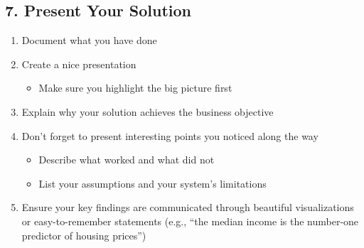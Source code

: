 \begin{slide}
  \section[-2]{7. Present Your Solution}

\begin{PauseHighLight}\squeeze
  \begin{enumerate}
  \item Document what you have done\pause
  \item Create a nice presentation
    \begin{itemize}
    \item Make sure you highlight the big picture first\pause
    \end{itemize}
  \item Explain why your solution achieves the business
    objective\pause
  \item Don’t forget to present interesting points you noticed along
    the way
    \begin{itemize}
    \item Describe what worked and what did not
    \item List your assumptions and your system’s limitations\pause
    \end{itemize}
  \item Ensure your key findings are communicated through beautiful
    visualizations or easy-to-remember statements (e.g., “the median
    income is the number-one predictor of housing prices”)\pause
  \end{enumerate}
\end{PauseHighLight}
\end{slide}


